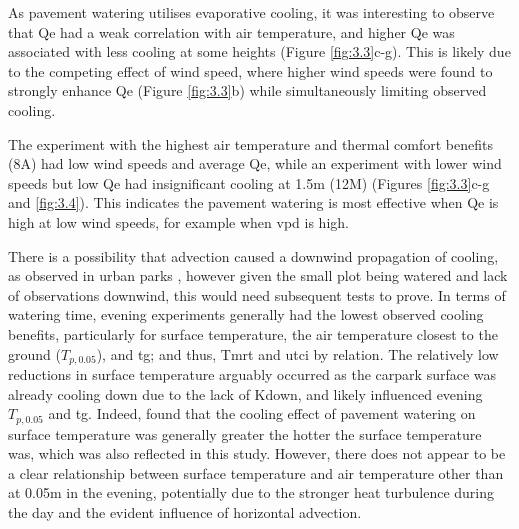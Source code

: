 \documentclass[final,3p,times,authoryear]{elsarticle}
\begin{document}
As pavement watering utilises evaporative cooling, it was interesting to observe that \gls{Qe} had a weak correlation with air temperature, and higher \gls{Qe} was associated with less cooling at some heights (Figure \ref{fig:3.3}c-g). This is likely due to the competing effect of wind speed, where higher wind speeds were found to strongly enhance \gls{Qe} (Figure \ref{fig:3.3}b) while simultaneously limiting observed cooling.

The experiment with the highest air temperature and thermal comfort benefits (8A) had low wind speeds and average \gls{Qe}, while an experiment with lower wind speeds but low \gls{Qe} had insignificant cooling at 1.5m (12M) (Figures \ref{fig:3.3}c-g and \ref{fig:3.4}). This indicates the pavement watering is most effective when \gls{Qe} is high at low wind speeds, for example when \gls{vpd} is high.

There is a possibility that advection caused a downwind propagation of cooling, as observed in urban parks \citep{Motazedian2020}, however given the small plot being watered and lack of observations downwind, this would need subsequent tests to prove. In terms of watering time, evening experiments generally had the lowest observed cooling benefits, particularly for surface temperature, the air temperature closest to the ground ($T_{p,0.05}$), and \gls{tg}; and thus, \gls{Tmrt} and \gls{utci} by relation. The relatively low reductions in surface temperature arguably occurred as the carpark surface was already cooling down due to the lack of \gls{Kdown}, and likely influenced evening $T_{p,0.05}$ and \gls{tg}. Indeed, \cite{Takebayashi2021} found that the cooling effect of pavement watering on surface temperature was generally greater the hotter the surface temperature was, which was also reflected in this study. However, there does not appear to be a clear relationship between surface temperature and air temperature other than at 0.05m in the evening, potentially due to the stronger heat turbulence during the day and the evident influence of horizontal advection.
\end{document}
